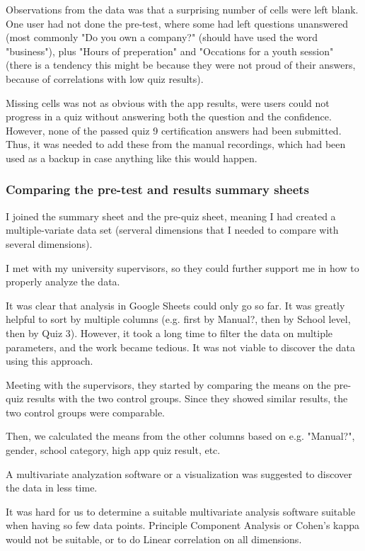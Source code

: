Observations from the data was that a surprising number of cells were left blank. One user had not done the pre-test, where some had left questions unanswered (most commonly "Do you own a company?" (should have used the word "business"), plus "Hours of preperation" and "Occations for a youth session" (there is a tendency this might be because they were not proud of their answers, because of correlations with low quiz results).

Missing cells was not as obvious with the app results, were users could not progress in a quiz without answering both the question and the confidence. However, none of the passed quiz 9 certification answers had been submitted. Thus, it was needed to add these from the manual recordings, which had been used as a backup in case anything like this would happen.

\subsubsection{Comparing the pre-test and results summary sheets}

I joined the summary sheet and the pre-quiz sheet, meaning I had created a multiple-variate data set (serveral dimensions that I needed to compare with several dimensions).

I met with my university supervisors, so they could further support me in how to properly analyze the data.

It was clear that analysis in Google Sheets could only go so far. It was greatly helpful to sort by multiple columns (e.g. first by Manual?, then by School level, then by Quiz 3). However, it took a long time to filter the data on multiple parameters, and the work became tedious. It was not viable to discover the data using this approach.

Meeting with the supervisors, they started by comparing the means on the pre-quiz results with the two control groups. Since they showed similar results, the two control groups were comparable.

Then, we calculated the means from the other columns based on e.g. "Manual?", gender, school category, high app quiz result, etc.

A multivariate analyzation software or a visualization was suggested to discover the data in less time.

It was hard for us to determine a suitable multivariate analysis software suitable when having so few data points. Principle Component Analysis or Cohen's kappa would not be suitable, or to do Linear correlation on all dimensions.

